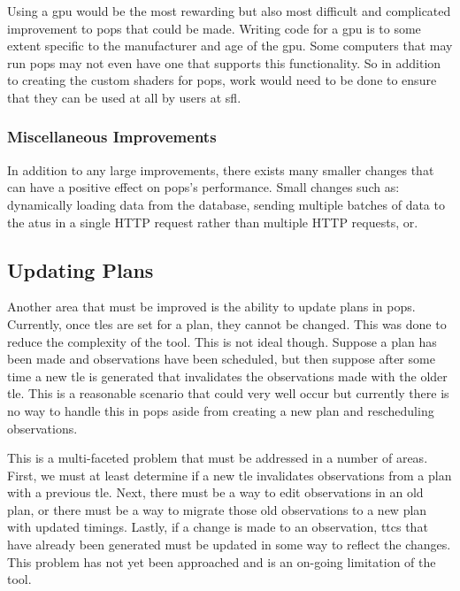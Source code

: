 
Using a \gls{gpu} would be the most rewarding but also most difficult and
complicated improvement to \gls{pops} that could be made. Writing code for a
\gls{gpu} is to some extent specific to the manufacturer and age of the
\gls{gpu}. Some computers that may run \gls{pops} may not even have one that
supports this functionality. So in addition to creating the custom shaders for
\gls{pops}, work would need to be done to ensure that they can be used at all
by users at \gls{sfl}.
 

\subsubsection{Miscellaneous Improvements}

In addition to any large improvements, there exists many smaller changes that
can have a positive effect on \gls{pops}'s performance. Small changes such as:
dynamically loading data from the database, sending multiple batches of data to
the \glspl{atu} in a single HTTP request rather than multiple HTTP requests,
or.


\subsection{Updating Plans}

Another area that must be improved is the ability to update plans in
\gls{pops}. Currently, once \glspl{tle} are set for a plan, they cannot be
changed. This was done to reduce the complexity of the tool. This is not ideal
though. Suppose a plan has been made and observations have been scheduled, but
then suppose after some time a new \gls{tle} is generated that invalidates the
observations made with the older \gls{tle}. This is a reasonable scenario that
could very well occur but currently there is no way to handle this in
\gls{pops} aside from creating a new plan and rescheduling observations.

This is a multi-faceted problem that must be addressed in a number of areas.
First, we must at least determine if a new \gls{tle} invalidates observations
from a plan with a previous \gls{tle}. Next, there must be a way to edit
observations in an old plan, or there must be a way to migrate those old
observations to a new plan with updated timings. Lastly, if a change is made to
an observation, \glspl{ttc} that have already been generated must be updated in
some way to reflect the changes. This problem has not yet been approached and
is an on-going limitation of the tool.



